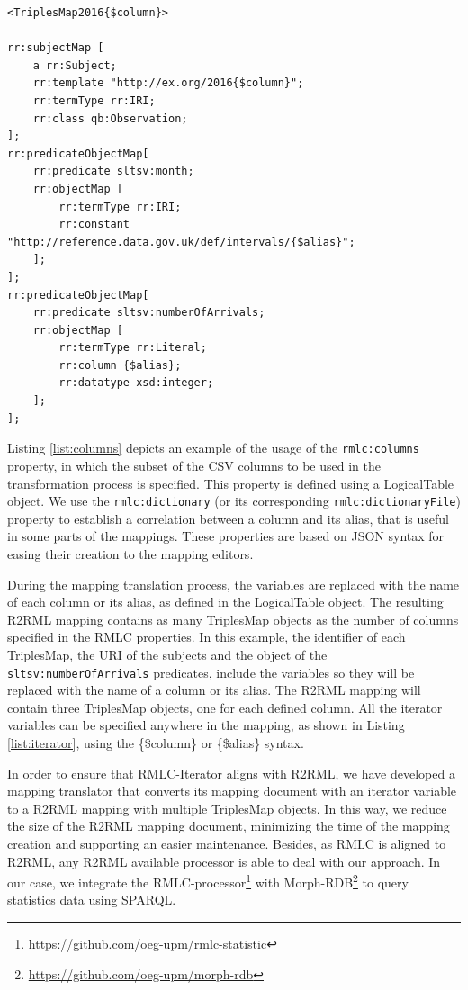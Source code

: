 \begin{lstlisting}[float,caption=Iterator variables in RMLC,frame=tlrb,label={list:iterator}, columns=fullflexible]
<TriplesMap2016{$column}>

rr:subjectMap [
    a rr:Subject;
    rr:template "http://ex.org/2016{$column}";
    rr:termType rr:IRI;
    rr:class qb:Observation;
];
rr:predicateObjectMap[
	rr:predicate sltsv:month;
    rr:objectMap [
    	rr:termType rr:IRI;
        rr:constant "http://reference.data.gov.uk/def/intervals/{$alias}";
    ];
];
rr:predicateObjectMap[
    rr:predicate sltsv:numberOfArrivals;
    rr:objectMap [
        rr:termType rr:Literal;
        rr:column {$alias};
        rr:datatype xsd:integer;
    ];
];
\end{lstlisting}


Listing \ref{list:columns} depicts an example of the usage of the \texttt{rmlc:columns} property, in which the subset of the CSV columns to be used in the transformation process is specified. This property is defined using a LogicalTable object. We use the \texttt{rmlc:dictionary} (or its corresponding \texttt{rmlc:dictionaryFile}) property to establish a correlation between a column and its alias, that is useful in some parts of the mappings. These properties are based on JSON syntax for easing their creation to the mapping editors.

During the mapping translation process, the variables are replaced with the name of each column or its alias, as defined in the LogicalTable object. The resulting R2RML mapping contains as many TriplesMap objects as the number of columns specified in the RMLC properties. In this example, the identifier of each TriplesMap, the URI of the subjects and the object of the \texttt{sltsv:numberOfArrivals} predicates, include the variables so they will be replaced with the name of a column or its alias. The R2RML mapping will contain three TriplesMap objects, one for each defined column. All the iterator variables can be specified anywhere in the mapping, as shown in Listing \ref{list:iterator}, using the \{\$column\} or \{\$alias\} syntax.

In order to ensure that RMLC-Iterator aligns with R2RML, we have developed a mapping translator that converts its mapping document with an iterator variable to a R2RML mapping with multiple TriplesMap objects. In this way, we reduce the size of the R2RML mapping document, minimizing the time of the mapping creation and supporting an easier maintenance. Besides, as RMLC is aligned to R2RML, any R2RML available processor is able to deal with our approach. In our case, we integrate the RMLC-processor\footnote{\url{https://github.com/oeg-upm/rmlc-statistic}} with Morph-RDB\footnote{\url{https://github.com/oeg-upm/morph-rdb}} to query statistics data using SPARQL.

